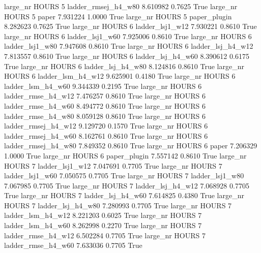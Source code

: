   large_nr    HOURS                 5 ladder_rmsej_h4_w80    8.610982      0.7625    True
  large_nr    HOURS                 5               paper    7.931224      1.0000    True
  large_nr    HOURS                 5        paper_plugin    8.282623      0.7625    True
  large_nr    HOURS                 6     ladder_lsj1_w12    7.930221      0.8610    True
  large_nr    HOURS                 6     ladder_lsj1_w60    7.925006      0.8610    True
  large_nr    HOURS                 6     ladder_lsj1_w80    7.947608      0.8610    True
  large_nr    HOURS                 6   ladder_lsj_h4_w12    7.813557      0.8610    True
  large_nr    HOURS                 6   ladder_lsj_h4_w60    8.390612      0.6175    True
  large_nr    HOURS                 6   ladder_lsj_h4_w80    8.124816      0.8610    True
  large_nr    HOURS                 6   ladder_lsm_h4_w12    9.625901      0.4180    True
  large_nr    HOURS                 6   ladder_lsm_h4_w60    9.344339      0.2195    True
  large_nr    HOURS                 6  ladder_rmse_h4_w12    7.476257      0.8610    True
  large_nr    HOURS                 6  ladder_rmse_h4_w60    8.494772      0.8610    True
  large_nr    HOURS                 6  ladder_rmse_h4_w80    8.059128      0.8610    True
  large_nr    HOURS                 6 ladder_rmsej_h4_w12    9.129720      0.1570    True
  large_nr    HOURS                 6 ladder_rmsej_h4_w60    8.162761      0.8610    True
  large_nr    HOURS                 6 ladder_rmsej_h4_w80    7.849352      0.8610    True
  large_nr    HOURS                 6               paper    7.206329      1.0000    True
  large_nr    HOURS                 6        paper_plugin    7.557142      0.8610    True
  large_nr    HOURS                 7     ladder_lsj1_w12    7.047691      0.7705    True
  large_nr    HOURS                 7     ladder_lsj1_w60    7.050575      0.7705    True
  large_nr    HOURS                 7     ladder_lsj1_w80    7.067985      0.7705    True
  large_nr    HOURS                 7   ladder_lsj_h4_w12    7.068928      0.7705    True
  large_nr    HOURS                 7   ladder_lsj_h4_w60    7.614825      0.4380    True
  large_nr    HOURS                 7   ladder_lsj_h4_w80    7.280993      0.7705    True
  large_nr    HOURS                 7   ladder_lsm_h4_w12    8.221203      0.6025    True
  large_nr    HOURS                 7   ladder_lsm_h4_w60    8.262998      0.2270    True
  large_nr    HOURS                 7  ladder_rmse_h4_w12    6.502284      0.7705    True
  large_nr    HOURS                 7  ladder_rmse_h4_w60    7.633036      0.7705    True
